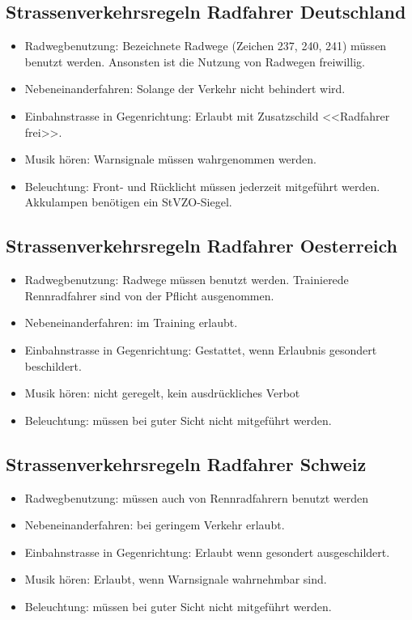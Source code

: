 \subsection{Strassenverkehrsregeln Radfahrer Deutschland}
\begin{itemize}
        \item Radwegbenutzung: Bezeichnete Radwege (Zeichen 237, 240, 241) müssen benutzt werden. Ansonsten ist die Nutzung von Radwegen freiwillig.
        \item Nebeneinanderfahren: Solange der Verkehr nicht behindert wird. 
        \item Einbahnstrasse in Gegenrichtung: Erlaubt mit Zusatzschild <<Radfahrer frei>>.
        \item Musik hören: Warnsignale müssen wahrgenommen werden.
        \item Beleuchtung: Front- und Rücklicht müssen jederzeit mitgeführt werden. Akkulampen benötigen ein StVZO-Siegel.
\end{itemize}

\subsection{Strassenverkehrsregeln Radfahrer Oesterreich}
\begin{itemize}
        \item Radwegbenutzung: Radwege müssen benutzt werden. Trainierede Rennradfahrer sind von der Pflicht ausgenommen.
        \item Nebeneinanderfahren: im Training erlaubt. 
        \item Einbahnstrasse in Gegenrichtung: Gestattet, wenn Erlaubnis gesondert beschildert.
        \item Musik hören: nicht geregelt, kein ausdrückliches Verbot
        \item Beleuchtung: müssen bei guter Sicht nicht mitgeführt werden.
\end{itemize}

\subsection{Strassenverkehrsregeln Radfahrer Schweiz}
\begin{itemize}
        \item Radwegbenutzung: müssen auch von Rennradfahrern benutzt werden
        \item Nebeneinanderfahren: bei geringem Verkehr erlaubt.
        \item Einbahnstrasse in Gegenrichtung: Erlaubt wenn gesondert ausgeschildert.
        \item Musik hören: Erlaubt, wenn Warnsignale wahrnehmbar sind.
        \item Beleuchtung: müssen bei guter Sicht nicht mitgeführt werden.
\end{itemize}

